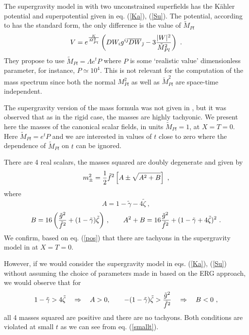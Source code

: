 \documentclass[11pt]{article}
\newcommand{\be}{\begin{equation}}
\newcommand{\ee}{\end{equation}}
\def\K{K{\"a}hler }
\newcommand{\rf}[1]{(\ref{#1})}
\def\be{\begin{equation}}
\def\ee{\end{equation}}
\begin{document}
The supergravity  model in \cite{DallAgata:2022abm} with two unconstrained superfields has the  \K potential and superpotential given in  eq. \rf{Ka}, \rf{Su}.  The potential, according to  \cite{DallAgata:2022abm} has the standard form,  the only difference is the value of $\tilde M_{Pl}$
\be
V= e^{K\over \tilde M_{Pl}^2} \left( DW_i g^{i{\bar \jmath} } {\overline {DW}}_{\bar \jmath}  - 3 {|W|^2\over \tilde M_{Pl}^2}\right) \ .
\label{pot}\ee
They propose to use $\tilde{M}_{Pl}=\Lambda e^{t} P$ where $P$ is some `realistic value' dimensionless parameter, for instance, $P \simeq 10^4$. This is not relevant for the computation of the mass spectrum since both the normal $M_{Pl}^2$ as well as $\tilde {M}_{Pl}^2$ are space-time independent. 

The supergravity version of the mass formula was not given in \cite{DallAgata:2022abm}, but it was observed that as in the rigid case, the masses are highly tachyonic. We present here the masses of the canonical scalar fields, in units $\tilde M_{Pl}=1$, at $X=T=0$. Here $\tilde M_{Pl}= e^t P$ and we are interested in values of $t$ close to zero where the dependence of  $\tilde M_{Pl}$ on $t$ can be ignored.

There are 4 real scalars, the masses squared are doubly degenerate and given by
\be
m^2_{\pm}={1\over 2} \tilde f ^2\left[ A \pm \sqrt {A^2 + B}\right] \ ,
\ee
where
\be
A= 1 -\tilde \gamma  -4 \tilde \zeta  \ ,
\ee
\be
B=16 \left(  {\tilde g^2\over \tilde f^2} + (1- \tilde \gamma )   \tilde \zeta\right)\, , \qquad A^2+B= 16   {\tilde g^2\over \tilde f^2} + (1- \tilde \gamma +   4\tilde \zeta)^2 \ .
\ee
We confirm,  based on eq. \rf{pos}   that  there are tachyons in the supergravity model in \cite{DallAgata:2022abm} at $X= T=0$. 

However, if we would consider the supergravity model  in  eqs. \rf{Ka}, \rf{Su} without assuming the choice of parameters made in \cite{DallAgata:2022abm} based on the ERG approach, we would observe that for 
\be
 1- \tilde \gamma  > 4\tilde \zeta  \quad       \Rightarrow  \quad   A>0, \qquad 
-( 1-   \tilde \gamma    ) \tilde \zeta > {\tilde g^2\over \tilde f^2}  \quad      \Rightarrow  \quad       B<0 \ ,
\label{2}\ee 
all 4 masses squared are positive and there are no tachyons. Both conditions are violated at small $t$ as we can see from eq. \rf{smallt}.
\end{document}
